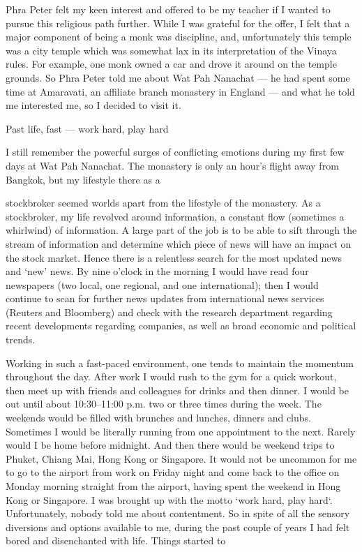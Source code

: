 Phra Peter felt my keen interest and offered to be my teacher if I
wanted to pursue this religious path further. While I was grateful for
the offer, I felt that a major component of being a monk was discipline,
and, unfortunately this temple was a city temple which was somewhat lax
in its interpretation of the Vinaya rules. For example, one monk owned a
car and drove it around on the temple grounds. So Phra Peter told me
about Wat Pah Nanachat --- he had spent some time at Amaravati, an
affiliate branch monastery in England --- and what he told me interested
me, so I decided to visit it.

Past life, fast --- work hard, play hard

I still remember the powerful surges of conflicting emotions during my
first few days at Wat Pah Nanachat. The monastery is only an hour's
flight away from Bangkok, but my lifestyle there as a

stockbroker seemed worlds apart from the lifestyle of the monastery. As
a stockbroker, my life revolved around information, a constant flow
(sometimes a whirlwind) of information. A large part of the job is to be
able to sift through the stream of information and determine which piece
of news will have an impact on the stock market. Hence there is a
relentless search for the most updated news and `new' news. By nine
o'clock in the morning I would have read four newspapers (two local, one
regional, and one international); then I would continue to scan for
further news updates from international news services (Reuters and
Bloomberg) and check with the research department regarding recent
developments regarding companies, as well as broad economic and
political trends.

Working in such a fast-paced environment, one tends to maintain the
momentum throughout the day. After work I would rush to the gym for a
quick workout, then meet up with friends and colleagues for drinks and
then dinner. I would be out until about 10:30--11:00 p.m. two or three
times during the week. The weekends would be filled with brunches and
lunches, dinners and clubs. Sometimes I would be literally running from
one appointment to the next. Rarely would I be home before midnight. And
then there would be weekend trips to Phuket, Chiang Mai, Hong Kong or
Singapore. It would not be uncommon for me to go to the airport from
work on Friday night and come back to the office on Monday morning
straight from the airport, having spent the weekend in Hong Kong or
Singapore. I was brought up with the motto `work hard, play hard`.
Unfortunately, nobody told me about contentment. So in spite of all the
sensory diversions and options available to me, during the past couple
of years I had felt bored and disenchanted with life. Things started to

